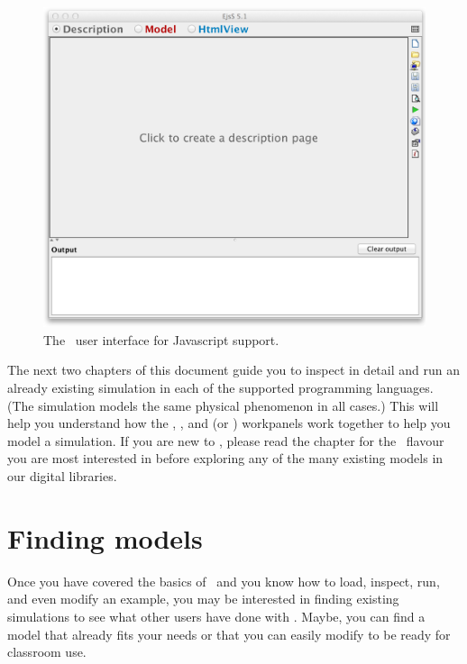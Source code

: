 \begin{figure}[htb]
  \centering
  \includegraphics[scale=\scale]{01Introduction/images/EjsInterfaceJS.png}
  \caption{The \Ejs\ user interface for Javascript support.}
  \label{fig:01Introduction/EjsInterfaceJS}
\end{figure}

The next two chapters of this document guide you to inspect in detail and run an already existing simulation in each of the supported programming languages. (The simulation models the same physical phenomenon in all cases.) This will help you understand how the , , and  (or ) workpanels work together to help you model a simulation. 
If you are new to \Ejs, please read the chapter for the \ejs\ flavour you are most interested in before exploring any of the many existing models in our digital libraries.

\section{Finding models}\label{section:01FindingModels}

Once you have covered the basics of \ejs\ and you know how to load, inspect, run, and even modify an example, you may be interested in finding existing simulations to see what  other users have done with \ejs. Maybe, you can find a model that already fits your needs or that you can easily modify to be ready for classroom use.

